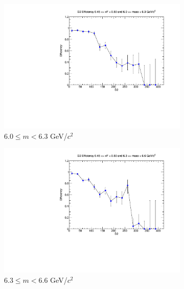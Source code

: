\begin{figure}[p]
\begin{subfigure}[b]{0.32\textwidth}
        \includegraphics[width=\textwidth]{./kTrackerEfficiencyPlots/D2_Efficiency_xF9_mass6.pdf}
        \caption{$6.0 \leq m < 6.3$ GeV/$c^2$}
        \label{fig:xF9_mass6}
    \end{subfigure}
    \hfill
    \begin{subfigure}[b]{0.32\textwidth}
        \centering
        \includegraphics[width=\textwidth]{./kTrackerEfficiencyPlots/D2_Efficiency_xF9_mass7.pdf}
        \caption{$6.3 \leq m < 6.6$ GeV/$c^2$}
        \label{fig:xF9_mass7}
    \end{subfigure}
    \hfill
    \begin{subfigure}[b]{0.32\textwidth}
        \centering

\end{subfigure}
\end{figure}
